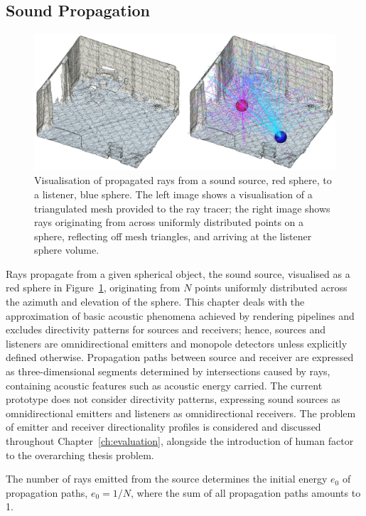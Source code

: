 \subsection{Sound Propagation}
\begin{figure}
    \centering
    \includegraphics[width=1\linewidth]{rt-room-test}
    \caption[Ray Tracing --- reflection diagram]{Visualisation of propagated rays from a sound source, red sphere, to a listener, blue sphere. The left image shows a visualisation of a triangulated mesh provided to the ray tracer; the right image shows rays originating from across uniformly distributed points on a sphere, reflecting off mesh triangles, and arriving at the listener sphere volume.}
    \label{fig:rt-room-demo}
\end{figure}
Rays propagate from a given spherical object, the sound source, visualised as a red sphere in Figure~\ref{fig:rt-room-demo}, originating from $N$ points uniformly distributed across the azimuth and elevation of the sphere. This chapter deals with the approximation of basic acoustic phenomena achieved by rendering pipelines and excludes directivity patterns for sources and receivers; hence, sources and listeners are omnidirectional emitters and monopole detectors unless explicitly defined otherwise. Propagation paths between source and receiver are expressed as three-dimensional segments determined by intersections caused by rays, containing acoustic features such as acoustic energy carried. The current prototype does not consider directivity patterns, expressing sound sources as omnidirectional emitters and listeners as omnidirectional receivers. The problem of emitter and receiver directionality profiles is considered and discussed throughout Chapter~\ref{ch:evaluation}, alongside the introduction of human factor to the overarching thesis problem.\par
The number of rays emitted from the source determines the initial energy $e_0$ of propagation paths, $e_0 = 1 / N$, where the sum of all propagation paths amounts to 1. \par
